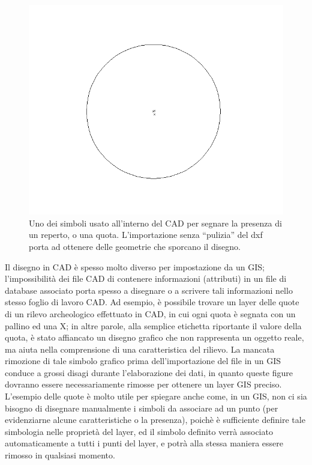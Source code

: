 		\begin{figure}
			\centering
			\includegraphics[scale=0.25]{img/segno}
			\caption{{\small Uno dei simboli usato all'interno del CAD per segnare la presenza di un reperto, o una quota. L'importazione senza ``pulizia'' del dxf porta ad ottenere delle geometrie che sporcano il disegno.}}
		\end{figure}
		
		Il disegno in CAD è spesso molto diverso per impostazione da un GIS; l'impossibilità dei file CAD di contenere informazioni (attributi) in un file di database associato porta spesso a disegnare o a scrivere tali informazioni nello stesso foglio di lavoro CAD. Ad esempio, è possibile trovare un layer delle quote di un rilevo archeologico effettuato in CAD, in cui ogni quota è segnata con un pallino ed una X; in altre parole, alla semplice etichetta riportante il valore della quota, è stato affiancato un disegno grafico che non rappresenta un oggetto reale, ma aiuta nella comprensione di una caratteristica del rilievo.  La mancata rimozione di tale simbolo grafico prima dell'importazione del file in un GIS conduce a grossi disagi durante l'elaborazione dei dati, in quanto queste figure dovranno essere necessariamente rimosse per ottenere un layer GIS preciso. L'esempio delle quote è molto utile per spiegare anche come, in un GIS, non ci sia bisogno di disegnare manualmente i simboli da associare ad un punto (per evidenziarne alcune caratteristiche o la presenza), poichè è sufficiente definire tale simbologia nelle proprietà del layer, ed il simbolo definito verrà associato automaticamente a tutti i punti del layer, e potrà alla stessa maniera essere rimosso in qualsiasi momento.


